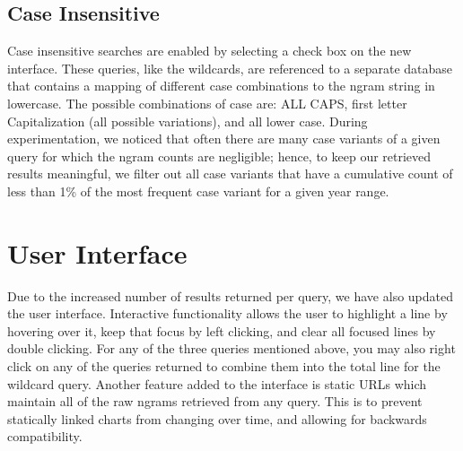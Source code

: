 \documentclass[11pt]{article}
\begin{document}
\subsection{Case Insensitive}
Case insensitive searches are enabled by selecting a check box on the new interface. These queries, like the wildcards, are referenced to a separate database that contains a mapping of different case combinations to the ngram string in lowercase. The possible combinations of case are: ALL CAPS, first letter Capitalization (all possible variations), and all lower case. During experimentation, we noticed that often there are many case variants of a given query for which the ngram counts are negligible; hence, to keep our retrieved results meaningful, we filter out all case variants that have a cumulative count of less than 1\% of the most frequent case variant for a given year range.



\section{User Interface}
\label{sec:interface}
Due to the increased number of results returned per query, we have also updated the user interface. Interactive functionality allows the user to highlight a line by hovering over it, keep that focus by left clicking, and clear all focused lines by double clicking. For any of the three queries mentioned above, you may also right click on any of the queries returned to combine them into the total line for the wildcard query. Another feature added to the interface is static URLs which maintain all of the raw ngrams retrieved from any query. This is to prevent statically linked charts from changing over time, and allowing for backwards compatibility.
\end{document}
